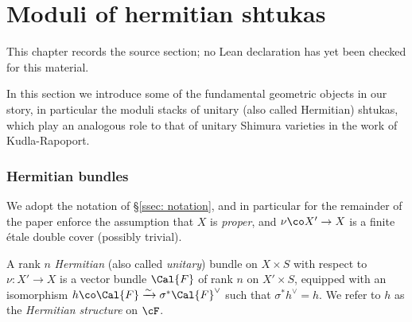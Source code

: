 \chapter{Moduli of hermitian shtukas}
\label{higher-siegel-weil-unitary-nonsingular-terms-chapter-06}

\begin{remark}
\label{higher-siegel-weil-unitary-nonsingular-terms-chapter-06-source}
This chapter records the source section; no Lean declaration has yet been checked for this material.
\notready
\end{remark}

\label{sec: unitary shtukas}

In this section we introduce some of the fundamental geometric objects in our story, in particular the moduli stacks of unitary (also called Hermitian) shtukas, which play an analogous role to that of unitary Shimura varieties in the work of Kudla-Rapoport.

\subsection{Hermitian bundles}


We adopt the notation of \S \ref{ssec: notation}, and in particular for the remainder of the paper enforce the assumption that $X$ is \emph{proper}, and $\nu \co X' \rightarrow X$ is a finite \'{e}tale double cover (possibly trivial).

\begin{defn}
\notready A rank $n$ \emph{Hermitian} (also called \emph{unitary}) bundle on $X \times S$ with respect to $\nu:X'\to X$ is a vector bundle $\Cal{F}$ of rank $n$ on $X' \times S$, equipped with an isomorphism $h \co \Cal{F} \xrightarrow{\sim} \sigma^* \Cal{F}^{\vee}$ such that $\sigma^* h^{\vee} = h$. We refer to $h$ as the \emph{Hermitian structure} on $\cF$.
\end{defn}

